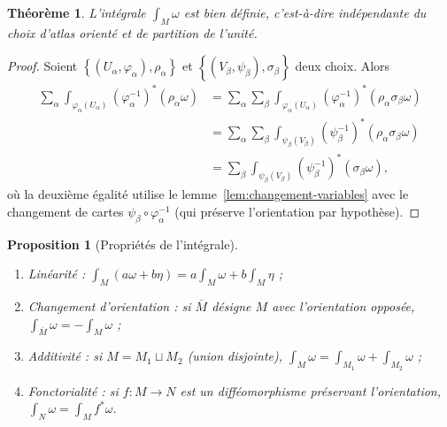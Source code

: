 \documentclass[12pt,a4paper,openany]{book}
\theoremstyle{definition}
\theoremstyle{plain}
\newtheorem{theoreme}[definition]{Théorème}
\newtheorem{proposition}[definition]{Proposition}
\theoremstyle{remark}
\newcommand{\set}[1]{\left\{#1\right\}}
\begin{document}
\begin{theoreme}\label{thm:integrale-bien-definie}
L'intégrale $\int_M \omega$ est bien définie, c'est-à-dire indépendante
du choix d'atlas orienté et de partition de l'unité.
\end{theoreme}

\begin{proof}
Soient $\set{(U_\alpha, \varphi_\alpha), \rho_\alpha}$ et
$\set{(V_\beta, \psi_\beta), \sigma_\beta}$ deux choix. Alors
\begin{align*}
  \sum_\alpha \int_{\varphi_\alpha(U_\alpha)}
    (\varphi_\alpha^{-1})^*(\rho_\alpha \omega)
  &= \sum_\alpha \sum_\beta \int_{\varphi_\alpha(U_\alpha)}
    (\varphi_\alpha^{-1})^*(\rho_\alpha \sigma_\beta \omega) \\
  &= \sum_\alpha \sum_\beta \int_{\psi_\beta(V_\beta)}
    (\psi_\beta^{-1})^*(\rho_\alpha \sigma_\beta \omega) \\
  &= \sum_\beta \int_{\psi_\beta(V_\beta)}
    (\psi_\beta^{-1})^*(\sigma_\beta \omega),
\end{align*}
où la deuxième égalité utilise le lemme~\ref{lem:changement-variables}
avec le changement de cartes
$\psi_\beta \circ \varphi_\alpha^{-1}$ (qui préserve l'orientation
par hypothèse).
\end{proof}

\begin{proposition}[Propriétés de l'intégrale]\label{prop:proprietes-integrale}%
\begin{enumerate}[label=\textup{(\roman*)}]
  \item \emph{Linéarité :}
    $\int_M (a\omega + b\eta) = a \int_M \omega + b \int_M \eta$ ;
  \item \emph{Changement d'orientation :} si $\overline{M}$ désigne $M$
    avec l'orientation opposée,
    $\int_{\overline{M}} \omega = -\int_M \omega$ ;
  \item \emph{Additivité :} si $M = M_1 \sqcup M_2$ (union disjointe),
    $\int_M \omega = \int_{M_1} \omega + \int_{M_2} \omega$ ;
  \item \emph{Fonctorialité :} si $f \colon M \to N$ est un
    difféomorphisme préservant l'orientation,
    $\int_N \omega = \int_M f^*\omega$.
\end{enumerate}
\end{proposition}
\end{document}
